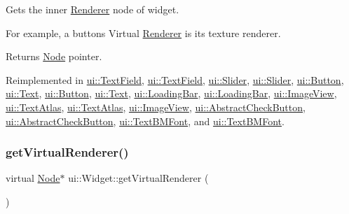 Gets the inner \hyperlink{classRenderer}{Renderer} node of widget.

For example, a button\textquotesingle{}s Virtual \hyperlink{classRenderer}{Renderer} is it\textquotesingle{}s texture renderer.

\begin{DoxyReturn}{Returns}
\hyperlink{classNode}{Node} pointer. 
\end{DoxyReturn}


Reimplemented in \hyperlink{classui_1_1TextField_a517f950a59caa4ec02a9245beb6d7283}{ui\+::\+Text\+Field}, \hyperlink{classui_1_1TextField_a63b989aa3b2a11854b1a7e2bf4659a40}{ui\+::\+Text\+Field}, \hyperlink{classui_1_1Slider_a72c8715bd62b7eda0e733c66e008c712}{ui\+::\+Slider}, \hyperlink{classui_1_1Slider_a801fd6363b412ecc766abe2eea7924b6}{ui\+::\+Slider}, \hyperlink{classui_1_1Button_ace7b0c2ed9f13afbc3f5979cf7a84747}{ui\+::\+Button}, \hyperlink{classui_1_1Text_ab595ff0bd28a29005e7f60ea662e7640}{ui\+::\+Text}, \hyperlink{classui_1_1Button_afa2bf5862c2e1893a34fbf88e5294fa3}{ui\+::\+Button}, \hyperlink{classui_1_1Text_a4a1e00d5f586e01d94c8dec146741dce}{ui\+::\+Text}, \hyperlink{classui_1_1LoadingBar_a7c47d606b1f71e090a3d9d2a904dbd92}{ui\+::\+Loading\+Bar}, \hyperlink{classui_1_1LoadingBar_a20c987a6a4fa0b50cb1ff3cf7cfd17b6}{ui\+::\+Loading\+Bar}, \hyperlink{classui_1_1ImageView_af98c832737c94dd9113967df15854318}{ui\+::\+Image\+View}, \hyperlink{classui_1_1TextAtlas_ad507ef83a1b5570819a24afe337d2835}{ui\+::\+Text\+Atlas}, \hyperlink{classui_1_1TextAtlas_a7341add4e53083db9de33dd5ab7eb0bd}{ui\+::\+Text\+Atlas}, \hyperlink{classui_1_1ImageView_adffa0c091b7d528ffc50c7b117be61bc}{ui\+::\+Image\+View}, \hyperlink{classui_1_1AbstractCheckButton_a4affc93c2631571aebcc499ddc2f0f62}{ui\+::\+Abstract\+Check\+Button}, \hyperlink{classui_1_1AbstractCheckButton_a51819285d8bfbe4b135dd09b8c382618}{ui\+::\+Abstract\+Check\+Button}, \hyperlink{classui_1_1TextBMFont_a7a78528934f644fac429d3107e8b2f94}{ui\+::\+Text\+B\+M\+Font}, and \hyperlink{classui_1_1TextBMFont_ac9d8900e87de50e47d330bf4cf3dece1}{ui\+::\+Text\+B\+M\+Font}.

\mbox{\label{classui_1_1Widget_a2ac31b8b4c7d3fa9d285bf194d685ccf}} 
\subsubsection{\texorpdfstring{get\+Virtual\+Renderer()}{getVirtualRenderer()}\hspace{0.1cm}{\footnotesize\ttfamily [2/2]}}
{\footnotesize\ttfamily virtual \hyperlink{classNode}{Node}$\ast$ ui\+::\+Widget\+::get\+Virtual\+Renderer (\begin{DoxyParamCaption}{ }\end{DoxyParamCaption})\hspace{0.3cm}{\ttfamily [virtual]}}

